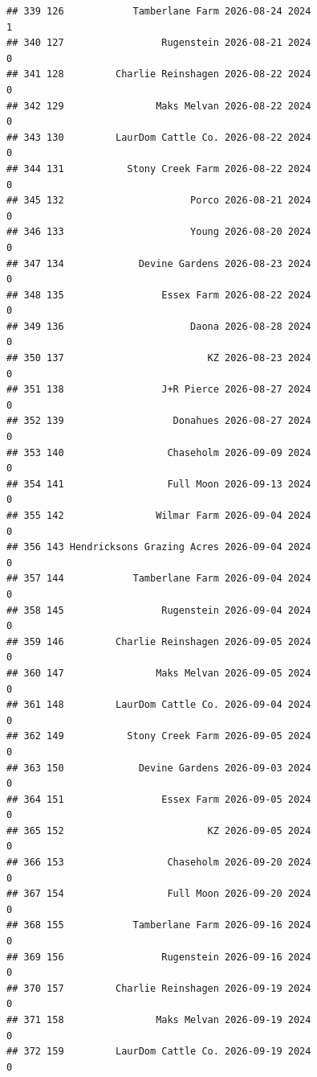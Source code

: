 \documentclass[
]{article}
\begin{document}
\begin{verbatim}
## 339 126            Tamberlane Farm 2026-08-24 2024                       1
## 340 127                 Rugenstein 2026-08-21 2024                       0
## 341 128         Charlie Reinshagen 2026-08-22 2024                       0
## 342 129                Maks Melvan 2026-08-22 2024                       0
## 343 130         LaurDom Cattle Co. 2026-08-22 2024                       0
## 344 131           Stony Creek Farm 2026-08-22 2024                       0
## 345 132                      Porco 2026-08-21 2024                       0
## 346 133                      Young 2026-08-20 2024                       0
## 347 134             Devine Gardens 2026-08-23 2024                       0
## 348 135                 Essex Farm 2026-08-22 2024                       0
## 349 136                      Daona 2026-08-28 2024                       0
## 350 137                         KZ 2026-08-23 2024                       0
## 351 138                 J+R Pierce 2026-08-27 2024                       0
## 352 139                   Donahues 2026-08-27 2024                       0
## 353 140                  Chaseholm 2026-09-09 2024                       0
## 354 141                  Full Moon 2026-09-13 2024                       0
## 355 142                Wilmar Farm 2026-09-04 2024                       0
## 356 143 Hendricksons Grazing Acres 2026-09-04 2024                       0
## 357 144            Tamberlane Farm 2026-09-04 2024                       0
## 358 145                 Rugenstein 2026-09-04 2024                       0
## 359 146         Charlie Reinshagen 2026-09-05 2024                       0
## 360 147                Maks Melvan 2026-09-05 2024                       0
## 361 148         LaurDom Cattle Co. 2026-09-04 2024                       0
## 362 149           Stony Creek Farm 2026-09-05 2024                       0
## 363 150             Devine Gardens 2026-09-03 2024                       0
## 364 151                 Essex Farm 2026-09-05 2024                       0
## 365 152                         KZ 2026-09-05 2024                       0
## 366 153                  Chaseholm 2026-09-20 2024                       0
## 367 154                  Full Moon 2026-09-20 2024                       0
## 368 155            Tamberlane Farm 2026-09-16 2024                       0
## 369 156                 Rugenstein 2026-09-16 2024                       0
## 370 157         Charlie Reinshagen 2026-09-19 2024                       0
## 371 158                Maks Melvan 2026-09-19 2024                       0
## 372 159         LaurDom Cattle Co. 2026-09-19 2024                       0

\end{verbatim}
\end{document}
